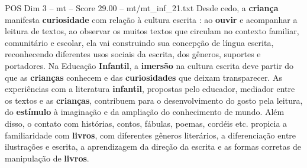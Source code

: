 \begin{textsample}{POS Dim 3 – mt – Score 29.00 – mt/mt\_inf\_21.txt}
Desde cedo, a \textbf{criança} manifesta \textbf{curiosidade} com relação à cultura escrita : ao \textbf{ouvir} e acompanhar a leitura de textos, ao observar os muitos textos que circulam no contexto familiar, comunitário e escolar, ela vai construindo sua concepção de língua escrita, reconhecendo diferentes usos sociais da escrita, dos gêneros, suportes e portadores.
Na Educação \textbf{Infantil}, a \textbf{imersão} na cultura escrita deve partir do que as \textbf{crianças} conhecem e das \textbf{curiosidades} que deixam transparecer.
As experiências com a literatura \textbf{infantil}, propostas pelo educador, mediador entre os textos e as \textbf{crianças}, contribuem para o desenvolvimento do gosto pela leitura, do \textbf{estímulo} à imaginação e da ampliação do conhecimento de mundo.
Além disso, o contato com histórias, contos, fábulas, poemas, cordéis etc. propicia a familiaridade com \textbf{livros}, com diferentes gêneros literários, a diferenciação entre ilustrações e escrita, a aprendizagem da direção da escrita e as formas corretas de manipulação de \textbf{livros}.

\end{textsample}
